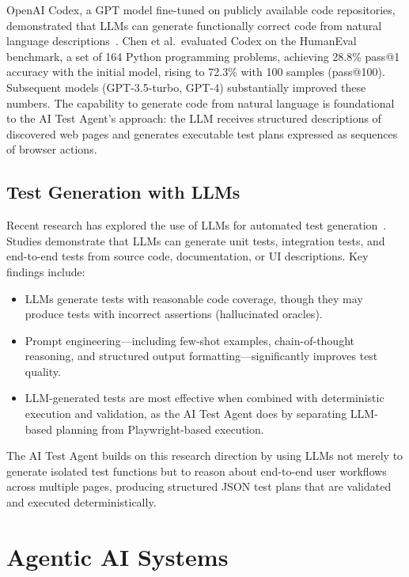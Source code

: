 OpenAI Codex, a GPT model fine-tuned on publicly available code
repositories, demonstrated that LLMs can generate functionally correct
code from natural language descriptions~\cite{chen2021codex}. Chen et
al.\ evaluated Codex on the HumanEval benchmark, a set of 164 Python
programming problems, achieving 28.8\% pass@1 accuracy with the initial
model, rising to 72.3\% with 100 samples (pass@100). Subsequent models
(GPT-3.5-turbo, GPT-4) substantially improved these numbers. The
capability to generate code from natural language is foundational to
the AI Test Agent's approach: the LLM receives structured descriptions
of discovered web pages and generates executable test plans expressed
as sequences of browser actions.

\subsection{Test Generation with LLMs}
\label{subsec:llm_test_gen}

Recent research has explored the use of LLMs for automated test
generation~\cite{king2024llmtest}. Studies demonstrate that LLMs can
generate unit tests, integration tests, and end-to-end tests from
source code, documentation, or UI descriptions. Key findings include:

\begin{itemize}[nosep]
  \item LLMs generate tests with reasonable code coverage, though they
        may produce tests with incorrect assertions (hallucinated oracles).
  \item Prompt engineering---including few-shot examples, chain-of-thought
        reasoning, and structured output formatting---significantly
        improves test quality.
  \item LLM-generated tests are most effective when combined with
        deterministic execution and validation, as the AI Test Agent
        does by separating LLM-based planning from Playwright-based
        execution.
\end{itemize}

The AI Test Agent builds on this research direction by using LLMs not
merely to generate isolated test functions but to reason about
end-to-end user workflows across multiple pages, producing structured
JSON test plans that are validated and executed deterministically.

\section{Agentic AI Systems}
\label{sec:agentic_ai}


